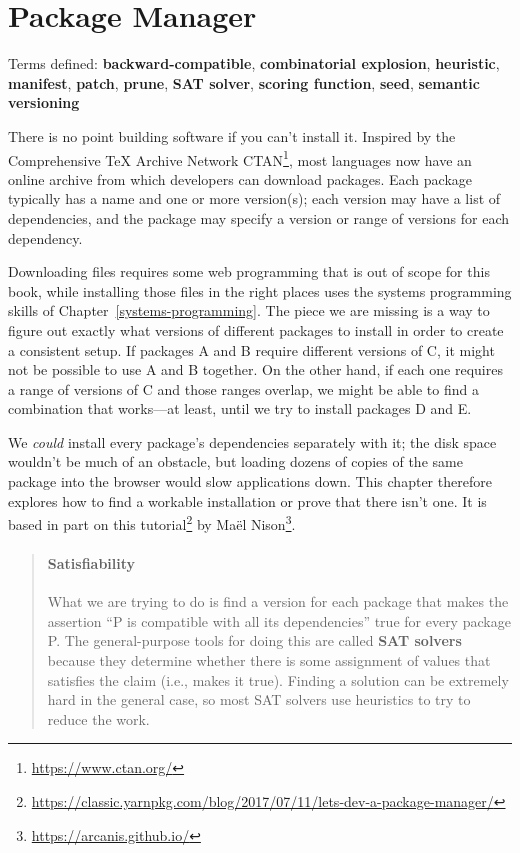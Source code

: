 \documentclass[krantzl]{krantz}
\newcommand{\chapref}[1]{Chapter~\ref{#1}}
\newcommand{\glossref}[1]{\textbf{#1}}
\newenvironment{callout}{\savenotes\begin{tBox}\begin{quotation}\toggletrue{inbox}\renewcommand{\thempfootnote}{\arabic{footnote}}}{\end{quotation}\vspace{\baselineskip}\end{tBox}\togglefalse{inbox}\spewnotes}
\newcommand{\hreffoot}[2]{{#1}\footnote{\href{#2}{#2}}}
\begin{document}
\chapter{Package Manager}\label{package-manager}


\noindent 
  Terms defined: \glossref{backward-compatible}, \glossref{combinatorial explosion}, \glossref{heuristic}, \glossref{manifest}, \glossref{patch}, \glossref{prune}, \glossref{SAT solver}, \glossref{scoring function}, \glossref{seed}, \glossref{semantic versioning}



There is no point building software if you can’t install it.
Inspired by the Comprehensive TeX Archive Network \hreffoot{CTAN}{https://www.ctan.org/},
most languages now have an online archive from which developers can download packages.
Each package typically has a name and one or more version(s);
each version may have a list of dependencies,
and the package may specify a version or range of versions for each dependency.


Downloading files requires some web programming that is out of scope for this book,
while installing those files in the right places
uses the systems programming skills of \chapref{systems-programming}.
The piece we are missing is a way to figure out exactly what versions of different packages to install
in order to create a consistent setup.
If packages A and B require different versions of C,
it might not be possible to use A and B together.
On the other hand,
if each one requires a range of versions of C and those ranges overlap,
we might be able to find a combination that works—at least,
until we try to install packages D and E.


We \emph{could} install every package’s dependencies separately with it;
the disk space wouldn’t be much of an obstacle,
but loading dozens of copies of the same package into the browser
would slow applications down.
This chapter therefore explores how to find a workable installation or prove that there isn’t one.
It is based in part on \hreffoot{this tutorial}{https://classic.yarnpkg.com/blog/2017/07/11/lets-dev-a-package-manager/} by \hreffoot{Maël Nison}{https://arcanis.github.io/}.

\begin{callout}


\subsubsection*{Satisfiability}


What we are trying to do is find a version for each package
that makes the assertion “P is compatible with all its dependencies” true
for every package P.
The general-purpose tools for doing this are called \glossref{SAT solvers}
because they determine whether there is some assignment of values
that satisfies the claim (i.e., makes it true).
Finding a solution can be extremely hard in the general case,
so most SAT solvers use heuristics to try to reduce the work.

\end{callout}
\end{document}

